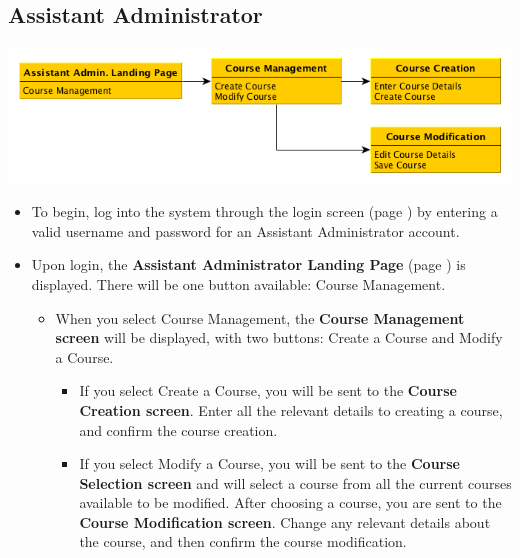 \documentclass{article}
\begin{document}
\subsection{Assistant Administrator}
\centerline{\includegraphics[scale=.6]{../images/UIMockups/pngs/assistantAdmin}}
\begin{itemize}
  \item To begin, log into the system through the login screen (page \pageref{login})
    by entering a valid username and password for an Assistant Administrator 
    account.
  \item Upon login, the \textbf{Assistant Administrator Landing Page} (page
    \pageref{landPg}) is displayed. There will be one button available: Course
    Management.
    \begin{itemize}
    \item When you select Course Management, the \textbf{Course Management
      screen} will be displayed, with two buttons: Create a Course and Modify a 
      Course.
      \begin{itemize}
      \item If you select Create a Course, you will be sent to the \textbf{Course
	Creation screen}. Enter all the relevant details to creating a course, and
	confirm the course creation.
      \item If you select Modify a Course, you will be sent to the \textbf{Course
	Selection screen} and will select a course from all the current courses
	available to be modified. After choosing a course, you are sent to the
	\textbf{Course Modification screen}. Change any relevant details about
	the course, and then confirm the course modification.
      \end{itemize}
    \end{itemize}
\end{itemize}
\end{document}
